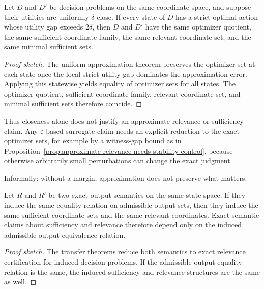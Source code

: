 \begin{proposition}\label{prop:global-approximation-stability}
Let $D$ and $D'$ be decision problems on the same coordinate space, and suppose their utilities are uniformly $\delta$-close. If every state of $D$ has a strict optimal action whose utility gap exceeds $2\delta$, then $D$ and $D'$ have the same optimizer quotient, the same sufficient-coordinate family, the same relevant-coordinate set, and the same minimal sufficient sets.
\end{proposition}

\begin{proof}[Proof sketch]
The uniform-approximation theorem preserves the optimizer set at each state once the local strict utility gap dominates the approximation error. Applying this statewise yields equality of optimizer sets for all states. The optimizer quotient, sufficient-coordinate family, relevant-coordinate set, and minimal sufficient sets therefore coincide.
\end{proof}

Thus closeness alone does not justify an approximate relevance or sufficiency claim. Any $\varepsilon$-based surrogate claim needs an explicit reduction to the exact optimizer sets, for example by a witness-gap bound as in Proposition~\ref{prop:approximate-relevance-needs-stability-control}, because otherwise arbitrarily small perturbations can change the exact judgment.

\par\medskip
\noindent
Informally: without a margin, approximation does not preserve what matters.
\par\medskip

\begin{proposition}\label{prop:semantic-claims-depend-only-on-output-equivalence}
Let $R$ and $R'$ be two exact output semantics on the same state space. If they induce the same equality relation on admissible-output sets, then they induce the same sufficient coordinate sets and the same relevant coordinates. Exact semantic claims about sufficiency and relevance therefore depend only on the induced admissible-output equivalence relation.
\end{proposition}

\begin{proof}[Proof sketch]
The transfer theorems reduce both semantics to exact relevance certification for induced decision problems. If the admissible-output equality relation is the same, the induced sufficiency and relevance structures are the same as well.
\end{proof}

